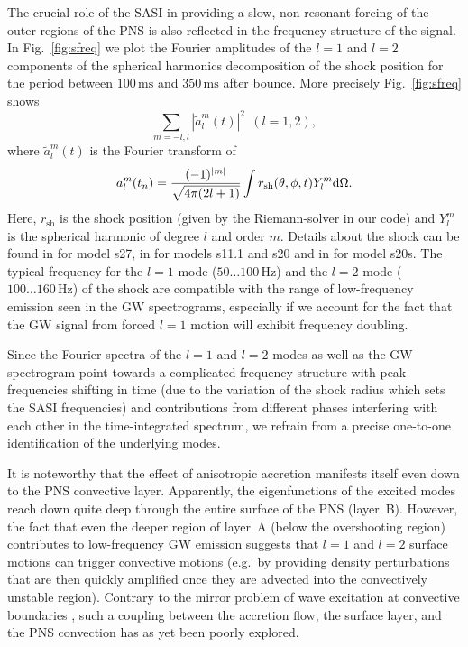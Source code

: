 The crucial role of the SASI in providing a slow, non-resonant forcing
of the outer regions of the PNS is also reflected in
the frequency structure of the signal. In Fig.~\ref{fig:sfreq} we
plot the Fourier amplitudes of the $l=1$ and $l=2$ components of the 
spherical harmonics decomposition of the shock position
for the period between $100 \, \mathrm{ms}$ and $350 \, \mathrm{ms}$ after bounce.
More precisely Fig.~\ref{fig:sfreq} shows
\begin{equation}
\sum_{m=-l,l}|\widetilde{a}_l^m(t)|^2 \ \ (l=1,2),
\end{equation} where $\widetilde{a}_l^m(t)$ is the Fourier transform of
\begin{equation} \label{eq:alsph}
a_l^m(t_n) = \frac{(-1)^{|m|}}{\sqrt{4\pi(2l+1)}} \int r_{\mathrm{sh}}(\theta,\phi,t) Y^m_l \mathrm{d} \Omega.
\end{equation} Here, $r_{\mathrm{sh}}$ is the shock position (given by the Riemann-solver in our code) 
and $Y^m_l$ is the spherical harmonic of degree $l$ and order $m$.
Details about the shock can be found in \citet{hanke_13} for model s27, in \citet{hanke_phd} for models
s11.1 and s20  and in \citet{melson_15b} for model s20s.
The typical frequency for the $l=1$ mode ($50\ldots 100 \, \mathrm{Hz}$) and the
$l=2$ mode ($100 \ldots 160 \, \mathrm{Hz}$) of the shock are
compatible with the range of low-frequency emission seen in the GW
spectrograms, especially if we account for the fact that the GW signal
from forced $l=1$ motion will exhibit frequency doubling.

Since the
Fourier spectra of the $l=1$ and $l=2$ modes as well as the
GW spectrogram point towards a complicated frequency
structure with peak frequencies shifting in time (due to the variation
of the shock radius which sets the SASI frequencies) and contributions
from different phases interfering with each other in the
time-integrated spectrum, we refrain from a precise one-to-one
identification of the underlying modes.  

It is noteworthy that the effect of anisotropic accretion manifests
itself even down to the PNS convective layer. Apparently, the
eigenfunctions of the excited modes reach down quite deep through the
entire surface of the PNS (layer~B). However, the fact that even the deeper region of layer~A 
(below the overshooting region) contributes to
low-frequency GW emission suggests that $l=1$ and $l=2$ surface
motions can trigger convective motions (e.g.\ by providing density
perturbations that are then quickly amplified once they are advected
into the convectively unstable region).  Contrary to the mirror problem of
wave excitation at convective boundaries
\citep{goldreich_90,lecoanet_12}, such a coupling between the
accretion flow, the surface layer, and the PNS convection has as yet
been poorly explored. 

